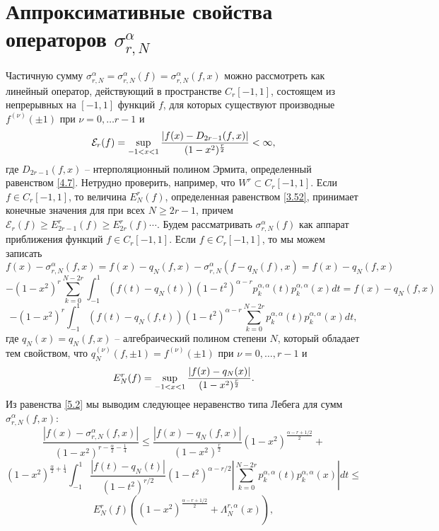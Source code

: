 \section{Аппроксимативные свойства операторов $\sigma_{r,N}^\alpha$}

   Частичную сумму $\sigma_{r,N}^\alpha=\sigma_{r,N}^\alpha(f)=\sigma_{r,N}^\alpha(f,x)$ можно рассмотреть как линейный оператор, действующий в пространстве  $C_r[-1,1]$, состоящем из непрерывных на $[-1,1]$ функций $f$, для которых существуют производные $f^{(\nu)}(\pm1)$ при $\nu=0,\ldots r-1$ и   \begin{equation}\label{5.1}
 \mathcal{ E}_r(f)=\sup_{-1<x<1}{|f(x)-D_{2r-1}(f,x)|\over (1-x^2)^\frac{r}{2}}<\infty,
\end{equation}
где $D_{2r-1}(f,x)$ -- нтерполяционный полином Эрмита, определенный равенством \eqref{4.7}.
Нетрудно проверить, например, что $W^r\subset C_r[-1,1]$. Если $f\in C_r[-1,1]$, то  величина $E_N^r(f)$, определенная равенством \eqref{3.52}, принимает конечные значения для при всех $N\ge 2r-1$, причем $\mathcal{ E}_r(f)\ge E_{2r-1}^r(f)\ge E_{2r}^r(f)\cdots$. Будем рассматривать $\sigma_{r,N}^\alpha(f)$ как аппарат приближения функций $f\in C_r[-1,1]$.
Если $f\in C_r[-1,1]$, то мы можем записать
$$
f(x)-\sigma_{r,N}^\alpha(f,x)=
 f(x)-q_N(f,x)-\sigma_{r,N}^\alpha(f-q_N(f),x)=f(x)-q_N(f,x)
$$
$$
-(1-x^2)^r \sum_{k=0}^{N-2r} \int_{-1}^1(f(t)-q_N(t))(1-t^2)^{\alpha-r} p_{k}^{\alpha,\alpha}(t)p_{k}^{\alpha,\alpha}(x)dt=f(x)-q_N(f,x)
$$
\begin{equation}\label{5.2}
-(1-x^2)^r\int_{-1}^1(f(t)-q_N(f,t))(1-t^2)^{\alpha-r}\sum_{k=0}^{N-2r}  p_{k}^{\alpha,\alpha}(t)p_{k}^{\alpha,\alpha}(x)dt,
\end{equation}
где $q_N(x)=q_N(f,x)$ -- алгебраический полином  степени $N$, который обладает тем свойством, что $q^{(\nu)}_N(f,\pm1)=f^{(\nu)}(\pm1)$ при $\nu=0,\ldots,r-1$  и
\begin{equation}\label{5.3}
E_N^r(f)=\sup_{-1<x<1}{|f(x)-q_N(x)|\over (1-x^2)^\frac{r}{2}}.
\end{equation}
 Из равенства \eqref{5.2} мы выводим следующее неравенство типа Лебега для сумм $\sigma_{r,N}^\alpha(f,x)$:
$$
\frac{|f(x)-\sigma_{r,N}^\alpha(f,x)|}{(1-x^2)^{r-\frac{\alpha}{2}-\frac14}}\le \frac{|f(x)-q_N(f,x)|}{(1-x^2)^\frac{r}{2}}(1-x^2)^\frac{\alpha-r+1/2}{2}+
$$
$$
(1-x^2)^{\frac{\alpha}{2}+\frac14}  \int_{-1}^1\frac{|f(t)-q_N(t)|}{(1-t^2)^{r/2}}(1-t^2)^{\alpha-r/2} \left|\sum_{k=0}^{N-2r}p_{k}^{\alpha,\alpha}(t)p_{k}^{\alpha,\alpha}(x)\right|dt\le
$$
\begin{equation}\label{5.4}
E_N^r(f)\left((1-x^2)^\frac{\alpha-r+1/2}{2}+\Lambda^{r,\alpha}_N(x)\right),
\end{equation}

